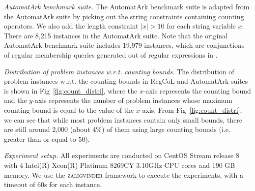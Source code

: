 \medskip
\noindent
\emph{AutomatArk benchmark suite.}
The AutomatArk benchmark suite is adapted from the AutomatArk suite \cite{z3str3re} by picking out the string constraints containing counting operators. We also add the length constraint $|x| > 10$ for each string variable $x$. There are 8,215 instances in the AutomatArk suite.
Note that the original AutomatArk benchmark suite \cite{z3str3re} includes 19,979 instances, which are conjunctions of regular membership queries generated out of regular expressions in \cite{automatark}.


\medskip
\noindent
\emph{Distribution of problem instances w.r.t. counting bounds. }
The distribution of problem instances w.r.t. the counting bounds in RegCoL and AutomatArk suites is shown in Fig~\ref{fig:count_distri}, where the $x$-axis represents the counting bound and the $y$-axis represents the number of problem instances whose maximum counting bound is equal to the value of the $x$-axis. 
From Fig~\ref{fig:count_distri}, we can see that while most problem instances contain only small bounds, there are still around 2,000  (about 4\%) of them using large counting bounds (i.e. greater than or equal to $50$).

\medskip
\noindent
\emph{Experiment setup.}
All experiments are conducted on CentOS Stream release 8 with 4 Intel(R) Xeon(R) Platinum 8269CY 3.10GHz CPU cores and 190 GB memory. We use the \textsc{zaligvinder} framework \cite{zaligvinder_2021} to execute the experiments, with a timeout of 60s for each instance.


